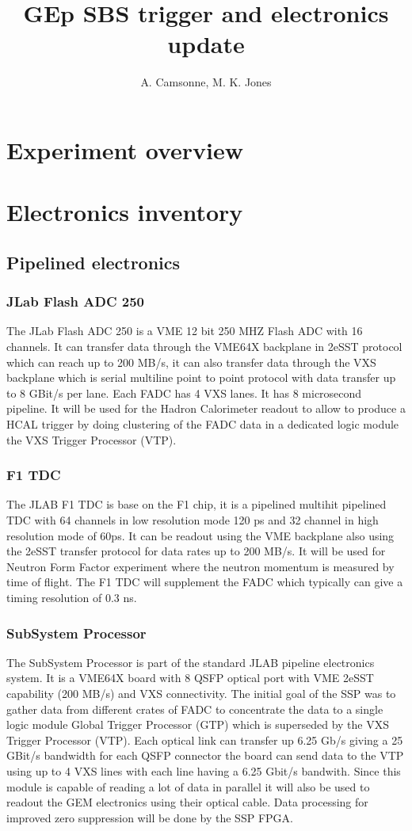 \documentclass{article}
\title{GEp SBS trigger and electronics update}
\author{A. Camsonne, M. K. Jones}
\begin{document}
\maketitle
\section{Experiment overview}

\section{Electronics inventory}

\subsection{Pipelined electronics}
\subsubsection{JLab Flash ADC 250}
The JLab Flash ADC 250 is a VME 12 bit 250 MHZ Flash ADC with 16 channels. It can transfer data through the VME64X backplane in 2eSST protocol which can reach up to 200 MB/s, it can also transfer data through the VXS backplane which is serial multiline point to point protocol with data transfer up to 8 GBit/s per lane. Each FADC has 4 VXS lanes. It has 8 microsecond pipeline. It will be used for the Hadron Calorimeter readout to allow to produce a HCAL trigger by doing clustering of the FADC data in a dedicated logic module the VXS Trigger Processor (VTP).  
\subsubsection{F1 TDC}
The JLAB F1 TDC is base on the F1 chip, it is a pipelined multihit pipelined TDC with 64 channels in low resolution mode 120 ps and 32 channel in high resolution mode of 60ps. It can be readout using the VME backplane also using the 2eSST transfer protocol for data rates up to 200 MB/s. It will be used for Neutron Form Factor experiment where the neutron momentum is measured by time of flight. The F1 TDC will supplement the FADC which typically can give a timing resolution of 0.3 ns.
\subsubsection{SubSystem Processor}
The SubSystem Processor is part of the standard JLAB pipeline electronics system. It is a VME64X board with 8 QSFP optical port with VME 2eSST capability (200 MB/s) and VXS connectivity.
The initial goal of the SSP was to gather data from different crates of FADC to concentrate the data to a single logic module Global Trigger Processor (GTP) which is superseded by the VXS Trigger Processor (VTP). Each optical link can transfer up 6.25 Gb/s giving a 25 GBit/s bandwidth for each QSFP connector the board can send data to the VTP using up to 4 VXS lines with each line having a 6.25 Gbit/s bandwith.
Since this module is capable of reading a lot of data in parallel it will also be used to readout the GEM electronics using their optical cable. Data processing for improved zero suppression will be done by the SSP FPGA.
\end{document}
